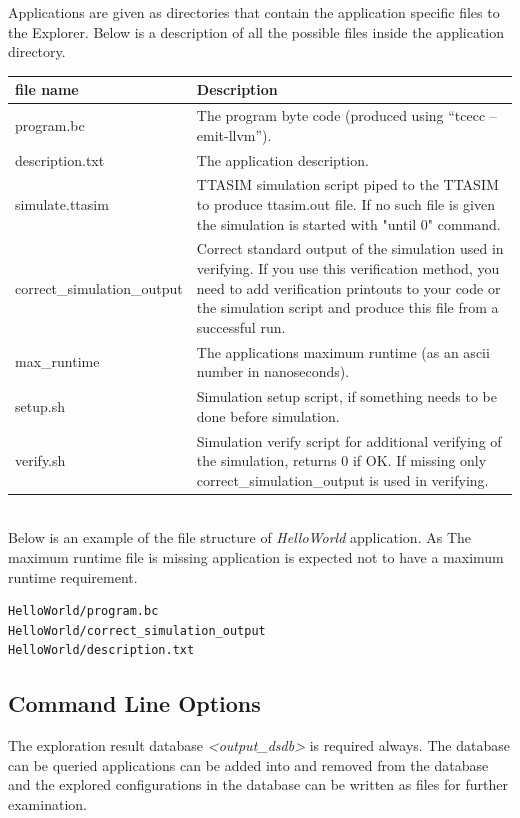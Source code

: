 \documentclass[twoside]{tceusermanual}
\begin{document}
Applications are given as directories that contain the application specific
files to the Explorer. Below is a description of all the possible files inside
the application directory.

\begin{tabular}{p{}p{}}
\textbf{file name} &\textbf{Description} \\
\hline
program.bc & The program byte code (produced using ``tcecc --emit-llvm'').\\
description.txt & The application description.\\
simulate.ttasim & TTASIM simulation script piped to the TTASIM to produce
ttasim.out file. If no such file is given the simulation is started with
"until 0" command.\\
correct\_simulation\_output & Correct standard output of the simulation used in
verifying. If you use this verification method, you need to add verification 
printouts to your code or the simulation script and produce this file from a
successful run.\\
max\_runtime & The applications maximum runtime (as an ascii number in nanoseconds).\\
setup.sh & Simulation setup script, if something needs to be done before
simulation.\\
verify.sh & Simulation verify script for additional verifying of the
simulation, returns 0 if OK. If missing only correct\_simulation\_output is used
in verifying.\\
\end{tabular}\\

Below is an example of the file structure of \emph{HelloWorld} application.
As The maximum runtime file is missing application is expected not to have a
maximum runtime requirement.
\begin{verbatim}
HelloWorld/program.bc
HelloWorld/correct_simulation_output
HelloWorld/description.txt
\end{verbatim}

\subsection{Command Line Options}

The exploration result database \emph{<output\_dsdb>} is required always. The
database can be queried applications can be added into and removed from the 
database and the explored configurations in the database can be written as
files for further examination.
\end{document}
